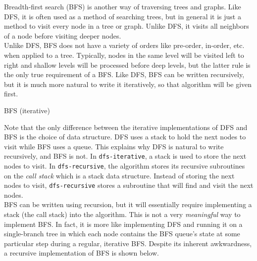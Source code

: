 Breadth-first search (BFS) is another way of traversing trees and graphs. Like DFS, it is often used as a method of searching trees, but in general it is just a method to visit every node in a tree or graph. Unlike DFS, it visits all neighbors of a node before visiting deeper nodes. \\

Unlike DFS, BFS does not have a variety of orders like pre-order, in-order, etc. when applied to a tree. Typically, nodes in the same level will be visited left to right and shallow levels will be processed before deep levels, but the latter rule is the only true requirement of a BFS. Like DFS, BFS can be written recursively, but it is much more natural to write it iteratively, so that algorithm will be given first. \\

\begin{algorithm}[H]
    \caption{BFS (iterative)}
\end{algorithm}
\vspace{5mm}

Note that the only difference between the iterative implementations of DFS and BFS is the choice of data structure. DFS uses a stack to hold the next nodes to visit while BFS uses a queue. This explains why DFS is natural to write recursively, and BFS is not. In \texttt{dfs-iterative}, a stack is used to store the next nodes to visit. In \texttt{dfs-recursive}, the algorithm stores its recursive subroutines on the \textit{call stack} which is a stack data structure. Instead of storing the next nodes to visit, \texttt{dfs-recursive} stores a subroutine that will find and visit the next nodes. \\

BFS can be written using recursion, but it will essentially require implementing a stack (the call stack) into the algorithm. This is not a very \textit{meaningful} way to implement BFS. In fact, it is more like implementing DFS and running it on a single-branch tree in which each node contains the BFS queue's state at some particular step during a regular, iterative BFS. Despite its inherent awkwardness, a recursive implementation of BFS is shown below. \\

